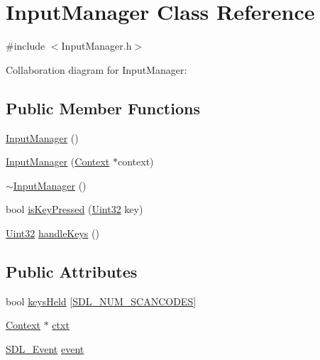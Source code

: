 \hypertarget{class_input_manager}{\section{Input\-Manager Class Reference}
\label{class_input_manager}
}


{\ttfamily \#include $<$Input\-Manager.\-h$>$}



Collaboration diagram for Input\-Manager\-:
\subsection*{Public Member Functions}
\begin{DoxyCompactItemize}
\item 
\hyperlink{class_input_manager_a8be46886da639b26d67181c29dab6d6c}{Input\-Manager} ()
\item 
\hyperlink{class_input_manager_a42033843aace6cf0396a5f4d1a909d37}{Input\-Manager} (\hyperlink{class_context}{Context} $\ast$context)
\item 
\hyperlink{class_input_manager_af518290877dd183606709d5852db5491}{$\sim$\-Input\-Manager} ()
\item 
bool \hyperlink{class_input_manager_a6074cd247f489fa5be941c66abcf2928}{is\-Key\-Pressed} (\hyperlink{_s_d_l__stdinc_8h_add440eff171ea5f55cb00c4a9ab8672d}{Uint32} key)
\item 
\hyperlink{_s_d_l__stdinc_8h_add440eff171ea5f55cb00c4a9ab8672d}{Uint32} \hyperlink{class_input_manager_a5ef5eb7f134cf7aeb93848ec530a26bd}{handle\-Keys} ()
\end{DoxyCompactItemize}
\subsection*{Public Attributes}
\begin{DoxyCompactItemize}
\item 
bool \hyperlink{class_input_manager_ac25bf7f3db8d303695827bbf959ebdcf}{keys\-Held} \mbox{[}\hyperlink{_s_d_l__scancode_8h_a82ab7cff701034fb40a47b5b3a02777bad2f6ac1f569510266d9dcd92f86d8b33}{S\-D\-L\-\_\-\-N\-U\-M\-\_\-\-S\-C\-A\-N\-C\-O\-D\-E\-S}\mbox{]}
\item 
\hyperlink{class_context}{Context} $\ast$ \hyperlink{class_input_manager_a3891b3d4d2ac13dfda2cccc96531ce76}{ctxt}
\item 
\hyperlink{union_s_d_l___event}{S\-D\-L\-\_\-\-Event} \hyperlink{class_input_manager_af4889753f2148b02fe0fba6300d283d2}{event}
\end{DoxyCompactItemize}


